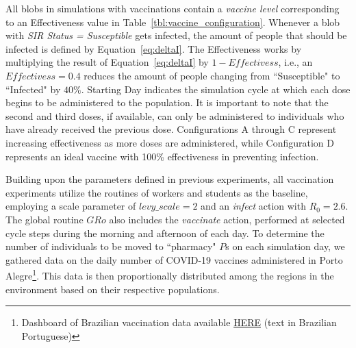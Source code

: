 All blobs in simulations with vaccinations contain a \textit{vaccine level} corresponding to an Effectiveness value in Table~\ref{tbl:vaccine_configuration}. Whenever a blob with \textit{SIR Status = Susceptible} gets infected, the amount of people that should be infected is defined by Equation~\ref{eq:deltaI}. The Effectiveness works by multiplying the result of Equation~\ref{eq:deltaI} by $1-Effectivess$, i.e., an $Effectivess=0.4$ reduces the amount of people changing from ``Susceptible" to ``Infected" by $40\%$. Starting Day indicates the simulation cycle at which each dose begins to be administered to the population. It is important to note that the second and third doses, if available, can only be administered to individuals who have already received the previous dose. Configurations A through C represent increasing effectiveness as more doses are administered, while Configuration D represents an ideal vaccine with 100\% effectiveness in preventing infection.

Building upon the parameters defined in previous experiments, all vaccination experiments utilize the routines of workers and students as the baseline, employing a scale parameter of $levy\_scale = 2$ and an \textit{infect} action with $R_0 = 2.6$. The global routine $GRo$ also includes the \textit{vaccinate} action, performed at selected cycle steps during the morning and afternoon of each day. To determine the number of individuals to be moved to ``pharmacy" $P$s on each simulation day, we gathered data on the daily number of COVID-19 vaccines administered in Porto Alegre\footnote{Dashboard of Brazilian vaccination data available \href{https://vacina.saude.rs.gov.br/}{HERE} (text in Brazilian Portuguese)}. This data is then proportionally distributed among the regions in the environment based on their respective populations.

